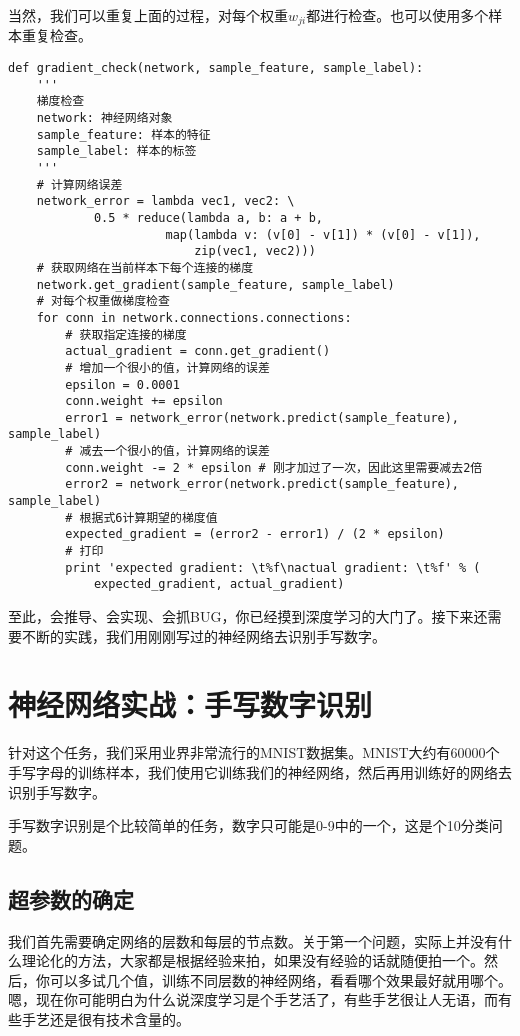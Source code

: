 当然，我们可以重复上面的过程，对每个权重\(w_{ji}\)都进行检查。也可以使用多个样本重复检查。
\begin{lstlisting}
def gradient_check(network, sample_feature, sample_label):
    '''
    梯度检查
    network: 神经网络对象
    sample_feature: 样本的特征
    sample_label: 样本的标签
    '''
    # 计算网络误差
    network_error = lambda vec1, vec2: \
            0.5 * reduce(lambda a, b: a + b, 
                      map(lambda v: (v[0] - v[1]) * (v[0] - v[1]),
                          zip(vec1, vec2)))
    # 获取网络在当前样本下每个连接的梯度
    network.get_gradient(sample_feature, sample_label)
    # 对每个权重做梯度检查    
    for conn in network.connections.connections: 
        # 获取指定连接的梯度
        actual_gradient = conn.get_gradient()
        # 增加一个很小的值，计算网络的误差
        epsilon = 0.0001
        conn.weight += epsilon
        error1 = network_error(network.predict(sample_feature), sample_label)
        # 减去一个很小的值，计算网络的误差
        conn.weight -= 2 * epsilon # 刚才加过了一次，因此这里需要减去2倍
        error2 = network_error(network.predict(sample_feature), sample_label)
        # 根据式6计算期望的梯度值
        expected_gradient = (error2 - error1) / (2 * epsilon)
        # 打印
        print 'expected gradient: \t%f\nactual gradient: \t%f' % (
            expected_gradient, actual_gradient)
\end{lstlisting}

至此，会推导、会实现、会抓BUG，你已经摸到深度学习的大门了。接下来还需要不断的实践，我们用刚刚写过的神经网络去识别手写数字。


\section{神经网络实战：手写数字识别}\label{Bp:9}
针对这个任务，我们采用业界非常流行的MNIST数据集。MNIST大约有60000个手写字母的训练样本，我们使用它训练我们的神经网络，然后再用训练好的网络去识别手写数字。

手写数字识别是个比较简单的任务，数字只可能是0-9中的一个，这是个10分类问题。

\subsection{超参数的确定}\label{Bp:10}

我们首先需要确定网络的层数和每层的节点数。关于第一个问题，实际上并没有什么理论化的方法，大家都是根据经验来拍，如果没有经验的话就随便拍一个。然后，你可以多试几个值，训练不同层数的神经网络，看看哪个效果最好就用哪个。嗯，现在你可能明白为什么说深度学习是个手艺活了，有些手艺很让人无语，而有些手艺还是很有技术含量的。

